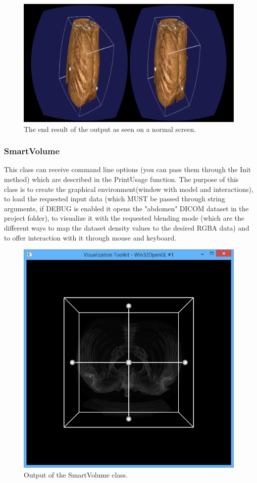 \documentclass[11pt]{article} %
\begin{document}
\begin{figure}[h!]
  \centering
\includegraphics[width=1.0\linewidth]{img/main_using.PNG}
  \caption{The end result of the output as seen on a normal screen.}
  \label{endResult}
\end{figure}

%
\FloatBarrier
\pagebreak
\subsubsection{SmartVolume}
This class can receive command line options (you can pass them through the Init method) which are described in the PrintUsage function. The purpose of this class is to create the graphical environment(window with model and interactions), to load the requested input data (which MUST be passed through string arguments, if DEBUG is enabled it opens the "abdomen" DICOM dataset in the project folder), to visualize it with the requested blending mode (which are the different ways to map the dataset density values to the desired RGBA data) and to offer interaction with it through mouse and keyboard.

\begin{figure}[h!]
  \centering
\includegraphics[width=0.4\linewidth]{img/smartvolumetricdemo_startscreen.PNG}
  \caption{Output of the SmartVolume class.}
\end{figure}
\end{document}
